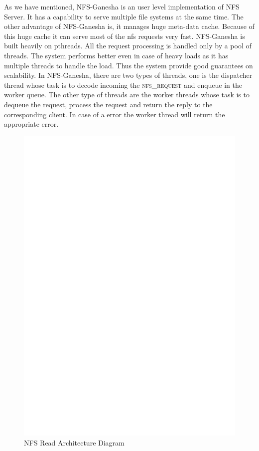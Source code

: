    As we have mentioned, NFS-Ganesha is an user level implementation of NFS Server. It has a capability to serve multiple file systems at the same time. The other advantage of NFS-Ganesha is, it manages huge meta-data cache. Because of this huge cache it can serve most of the nfs requests very fast. NFS-Ganesha is built heavily on pthreads.
All the request processing is handled only by a pool of threads. The system performs better even in case of heavy loads as it has multiple threads to handle the load. Thus the system provide good guarantees on scalability. In NFS-Ganesha, there are two types of threads, one is the dispatcher thread whose task is to decode incoming the \textsc{nfs\_request} and enqueue in the worker queue. The other type of threads are the worker threads whose task is to dequeue the request, process the request and return the reply to the corresponding client. In case of a error the worker thread will return the appropriate error.

\begin{figure}
\centering
\includegraphics[scale=0.7]{figures/Read.eps}
\caption{NFS Read Architecture Diagram}
\label{fig:NFSReadArch}
\end{figure}


